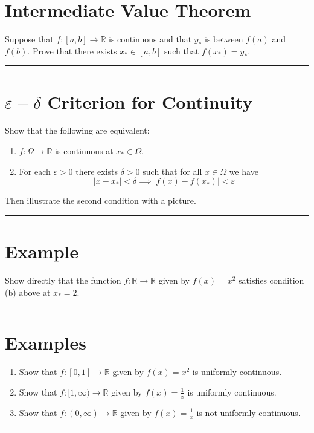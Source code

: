 \documentclass[12pt]{amsart}
\newcommand{\sep}[1]{\noindent\rule{\textwidth}{#1pt}}
\newcommand{\R}{\mathbb{R}}
\begin{document}
\section{Intermediate Value Theorem}%
\label{sec:intermediate_value_theorem}

Suppose that $f:[a,b]\rightarrow\R$ is continuous and that $y_\ast$ is between
$f(a)$ and $f(b)$. Prove that there exists $x_\ast\in[a,b]$ such that
$f(x_\ast) = y_\ast$.

\sep{2}

\section{$\varepsilon - \delta$ Criterion for Continuity}%
\label{sec:_varepsilon_delta_criterion_for_continuity}

Show that the following are equivalent:

\begin{enumerate}[label=(\alph*)]
  \item $f:\Omega\rightarrow\R$ is continuous at $x_\ast\in\Omega$.
  \item For each $\varepsilon>0$ there exists $\delta>0$ such that for all
    $x\in\Omega$ we have
    \begin{equation*}\label{eq:7b.0}
      |x-x_\ast|<\delta\implies|f(x)-f(x_\ast)|<\varepsilon
    \end{equation*}
\end{enumerate}

Then illustrate the second condition with a picture.

\sep{2}

\section{Example}%
\label{sec:example}

Show directly that the function $f:\R\rightarrow\R$ given by $f(x)=x^2$
satisfies condition (b) above at $x_\ast=2$.

\sep{2}

\section{Examples}%
\label{sec:examples}

\begin{enumerate}[label=(\alph*)]
  \item Show that $f:[0,1]\rightarrow\R$ given by $f(x)=x^2$ is uniformly
    continuous.
  \item Show that $f:[1,\infty)\rightarrow\R$ given by $f(x)=\frac{1}{x}$ is uniformly
    continuous.
  \item Show that $f:(0,\infty)\rightarrow\R$ given by $f(x)=\frac{1}{x}$ is
    not uniformly continuous.
\end{enumerate}

\sep{2}
\end{document}
